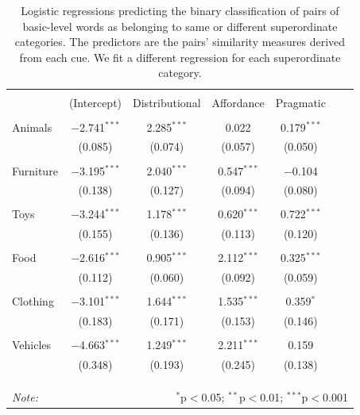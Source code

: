 \documentclass[english,,man,floatsintext]{apa6}
\begin{document}
\begin{table}[!htbp] \centering 
\caption{\label{tab:regressions} Logistic regressions predicting the binary classification of pairs of basic-level words as belonging to same or different superordinate categories. The predictors are the pairs' similarity measures derived from each cue. We fit a different regression for each superordinate category.} 
\label{} 
\begin{tabular}{@{\extracolsep{5pt}}lcccccc} 
\hline 
 & \multicolumn{4}{c}{} \\
 & (Intercept) & Distributional & Affordance & Pragmatic \\ 
\hline \\[-1.8ex] 
  Animals & $-$2.741$^{***}$ & 2.285$^{***}$ & 0.022 & 0.179$^{***}$\\
  & (0.085) & (0.074) & (0.057) & (0.050)\\
  & & & & & & \\
  Furniture & $-$3.195$^{***}$ & 2.040$^{***}$ & 0.547$^{***}$ & $-$0.104\\
  & (0.138) & (0.127) & (0.094) & (0.080) &\\
  & & & & & & \\
  Toys & $-$3.244$^{***}$ & 1.178$^{***}$ &  0.620$^{***}$ & 0.722$^{***}$\\
  & (0.155) & (0.136) & (0.113) & (0.120) &\\
  & & & & & & \\
  Food & $-$2.616$^{***}$ & 0.905$^{***}$ & 2.112$^{***}$ & 0.325$^{***}$\\
  & (0.112) & (0.060) & (0.092) & (0.059)\\
  & & & & & & \\
  Clothing & $-$3.101$^{***}$ & 1.644$^{***}$ & 1.535$^{***}$ & 0.359$^{*}$\\
  & (0.183) & (0.171) & (0.153) & (0.146)\\
  & & & & & & \\
  Vehicles & $-$4.663$^{***}$ & 1.249$^{***}$ & 2.211$^{***}$ & 0.159\\
  & (0.348) & (0.193) & (0.245) & (0.138)\\
  & & & & & & \\
 \\[-1.8ex] 

\hline \\[-1.8ex] 
\textit{Note:}  & \multicolumn{6}{r}{$^{*}$p$<$0.05; $^{**}$p$<$0.01; $^{***}$p$<$0.001} \\ 
\end{tabular} 
\end{table}
\end{document}
